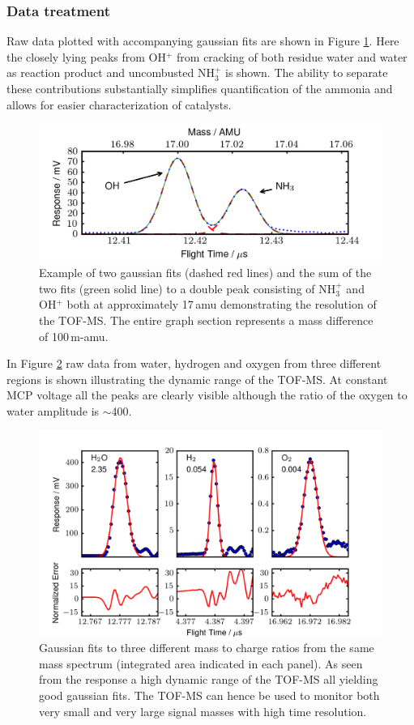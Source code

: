 \documentclass[aip,rsi]{revtex4-1}
\begin{document}
\subsubsection{Data treatment}
Raw data plotted with accompanying gaussian fits are shown in Figure \ref{fig:gaussian_fit}. Here the closely lying peaks from OH$^{+}$ from cracking of both residue water and water as reaction product and uncombusted NH$_3^{+}$ is shown. The ability to separate these contributions substantially simplifies quantification of the ammonia and allows for easier characterization of catalysts. 
\begin{figure}
 \includegraphics[width=14cm]{ammonia_OH_gauss_fit.png}%
 \caption{Example of two gaussian fits (dashed red lines) and the sum of the two fits (green solid line) to a double peak consisting of NH$_{3}^{+}$ and OH$^{+}$ both at approximately 17\,amu demonstrating the resolution of the TOF-MS. The entire graph section represents a mass difference of 100\,m-amu.\label{fig:gaussian_fit}}%
\end{figure}
In Figure \ref{fig:dynamic_range} raw data from water, hydrogen and oxygen from three different regions is shown illustrating the dynamic range of the TOF-MS. At constant MCP voltage all the peaks are clearly visible although the ratio of the oxygen to water amplitude is $\sim$400. 
\begin{figure}
 \includegraphics[width=14cm]{dynamic_range.png}%
 \caption{Gaussian fits to three different mass to charge ratios from the same mass spectrum (integrated area indicated in each panel). As seen from the response a high dynamic range of the TOF-MS all yielding good gaussian fits. The TOF-MS can hence be used to monitor both very small and very large signal masses with high time resolution.\label{fig:dynamic_range}}%
\end{figure}
\end{document}
